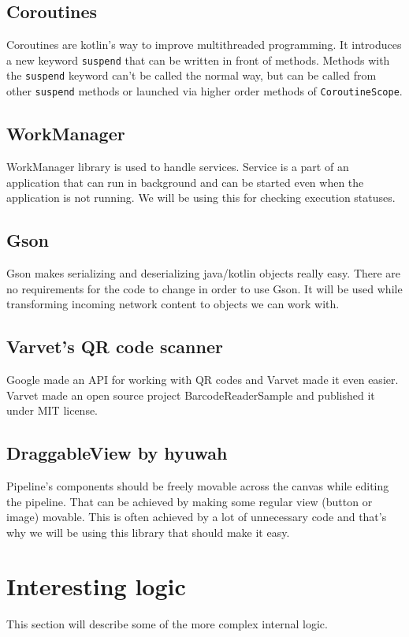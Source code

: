 \subsection{Coroutines}
Coroutines are kotlin's way to improve multithreaded programming.
It introduces a new keyword \verb|suspend| that can be written in front of methods.
Methods with the \verb|suspend| keyword can't be called the normal way, but can be called from other \verb|suspend| methods or launched via higher order methods of \verb|CoroutineScope|.

\subsection{WorkManager}
WorkManager library is used to handle services.
Service is a part of an application that can run in background and can be started even when the application is not running.
We will be using this for checking execution statuses.

\subsection{Gson}
Gson makes serializing and deserializing java/kotlin objects really easy.
There are no requirements for the code to change in order to use Gson.
It will be used while transforming incoming network content to objects we can work with.

\subsection{Varvet's QR code scanner}
Google made an API for working with QR codes and Varvet made it even easier.
Varvet made an open source project BarcodeReaderSample and published it under MIT license.

\subsection{DraggableView by hyuwah}
Pipeline's components should be freely movable across the canvas while editing the pipeline.
That can be achieved by making some regular view (button or image) movable.
This is often achieved by a lot of unnecessary code and that's why we will be using this library that should make it easy.

\section{Interesting logic}
This section will describe some of the more complex internal logic.

